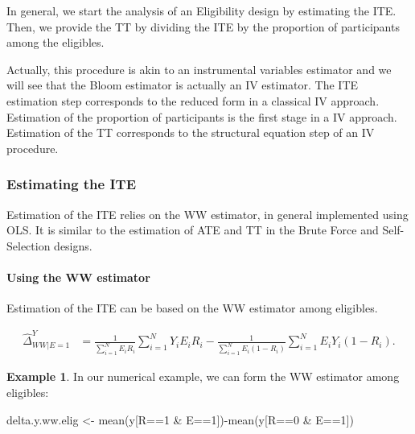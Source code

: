 \documentclass[
]{book}
\newenvironment{Shaded}{\begin{snugshade}}{\end{snugshade}}
\newcommand{\DecValTok}[1]{\textcolor[rgb]{0.00,0.00,0.81}{#1}}
\newcommand{\FunctionTok}[1]{\textcolor[rgb]{0.00,0.00,0.00}{#1}}
\newcommand{\NormalTok}[1]{#1}
\newcommand{\OtherTok}[1]{\textcolor[rgb]{0.56,0.35,0.01}{#1}}
\newcommand{\SpecialCharTok}[1]{\textcolor[rgb]{0.00,0.00,0.00}{#1}}
\theoremstyle{definition}
\theoremstyle{definition}
\newtheorem{example}{Example}[chapter]
\theoremstyle{definition}
\theoremstyle{definition}
\theoremstyle{remark}
\begin{document}
In general, we start the analysis of an Eligibility design by estimating the ITE.
Then, we provide the TT by dividing the ITE by the proportion of participants among the eligibles.

Actually, this procedure is akin to an instrumental variables estimator and we will see that the Bloom estimator is actually an IV estimator.
The ITE estimation step corresponds to the reduced form in a classical IV approach.
Estimation of the proportion of participants is the first stage in a IV approach.
Estimation of the TT corresponds to the structural equation step of an IV procedure.

\hypertarget{estimating-the-ite}{%
\subsubsection{Estimating the ITE}\label{estimating-the-ite}}

Estimation of the ITE relies on the WW estimator, in general implemented using OLS.
It is similar to the estimation of ATE and TT in the Brute Force and Self-Selection designs.

\hypertarget{using-the-ww-estimator-2}{%
\paragraph{Using the WW estimator}\label{using-the-ww-estimator-2}}

Estimation of the ITE can be based on the WW estimator among eligibles.

\begin{align*}
  \hat{\Delta}^Y_{WW|E=1} & = \frac{1}{\sum_{i=1}^N E_iR_i}\sum_{i=1}^N Y_iE_iR_i-\frac{1}{\sum_{i=1}^N E_i(1-R_i)}\sum_{i=1}^N E_iY_i(1-R_i).
\end{align*}

\begin{example}
\protect\hypertarget{exm:unnamed-chunk-94}{}{\label{exm:unnamed-chunk-94} }In our numerical example, we can form the WW estimator among eligibles:
\end{example}

\begin{Shaded}
\begin{Highlighting}[]
\NormalTok{delta.y.ww.elig }\OtherTok{\textless{}{-}} \FunctionTok{mean}\NormalTok{(y[R}\SpecialCharTok{==}\DecValTok{1} \SpecialCharTok{\&}\NormalTok{ E}\SpecialCharTok{==}\DecValTok{1}\NormalTok{])}\SpecialCharTok{{-}}\FunctionTok{mean}\NormalTok{(y[R}\SpecialCharTok{==}\DecValTok{0} \SpecialCharTok{\&}\NormalTok{ E}\SpecialCharTok{==}\DecValTok{1}\NormalTok{])}
\end{Highlighting}
\end{Shaded}
\end{document}
